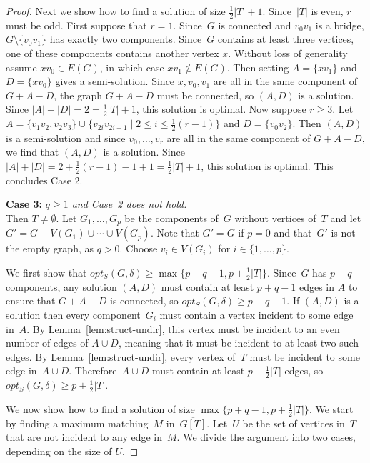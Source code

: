 \documentclass[11pt]{llncs}
\newcommand{\opts}{opt_S}
\newcommand\displaycase[1]{{\bf #1}}
\begin{document}
\begin{proof}
Next we show how to find a solution of size $\frac{1}{2}|T|+1$.  Since~$|T|$ is
even, $r$ must be odd. First suppose that $r=1$. Since~$G$ is connected and
$v_0v_1$ is a bridge, $G \setminus \{v_0v_1\}$ has exactly two components.
Since~$G$ contains at least three vertices, one of these components contains
another vertex $x$. Without loss of generality assume $xv_0 \in E(G)$, in which
case  $xv_1 \notin E(G)$.
Then setting $A=\{xv_1\}$ and $D=\{xv_0\}$ gives a
semi-solution.  Since $x,v_0,v_1$ are all in the same component of $G+A-D$, the
graph $G+A-D$ must be connected, so $(A,D)$ is a solution. Since
$|A|+|D|=2=\frac{1}{2}|T|+1$, this solution is optimal.  
Now suppose $r \geq 3$.
Let $A=\{v_1v_2,v_2v_3\}\cup\{v_{2i}v_{2i+1}\;|\;2\leq i\leq
\frac{1}{2}(r-1)\}$ and $D=\{v_0v_2\}$. Then $(A,D)$ is a semi-solution and since
$v_0,\ldots,v_r$ are all in the same component of $G+A-D$, we find that  $(A,D)$ is a
solution. Since $|A|+|D|=2+\frac{1}{2}(r-1)-1+1=\frac{1}{2}|T|+1$, this solution is
optimal.
This concludes Case 2.

\medskip
\noindent
\displaycase{Case 3:} {\em $q\geq 1$ and Case~2 does not hold.}\\
Then $T\neq\emptyset$.
Let $G_1,\ldots,G_p$ be the components of~$G$ without vertices of~$T$  and let
$G'=G-V(G_1)\cup\cdots\cup V(G_p)$. Note that $G'=G$ if $p=0$ and that~$G'$ is not
the empty graph, as $q>0$.  Choose $v_i \in V(G_i)$ for $i\in\{1,\ldots,p\}$.

We first show that $\opts(G,\delta)\geq \max\{p+q-1,p+\frac{1}{2}|T|\}$.
Since~$G$ has $p+q$ components, any solution $(A,D)$ must contain at least
$p+q-1$ edges in $A$ to ensure that $G+A-D$ is connected, so
$\opts(G,\delta)\geq p+q-1$. If $(A,D)$ is a solution then every
component~$G_i$ must contain a vertex incident to some edge in~$A$.  By
Lemma~\ref{lem:struct-undir}, this vertex must be incident to an even number of
edges of $A \cup D$, meaning that it must be incident to at least two such
edges. By Lemma~\ref{lem:struct-undir}, every vertex of~$T$ must be incident to
some edge in~$A \cup D$. Therefore~$A \cup D$ must contain at least
$p+\frac{1}{2}|T|$ edges, so $\opts(G,\delta)\geq p+\frac{1}{2}|T|$.

We now show how to find a solution of size $\max\{p+q-1,p+\frac{1}{2}|T|\}$. We
start by finding a maximum matching~$M$ in~$\overline{G[T]}$. Let~$U$ be the
set of vertices in~$T$ that are not incident to any edge in~$M$. We divide the
argument into two cases, depending on the size of $U$.


\end{proof}
\end{document}
